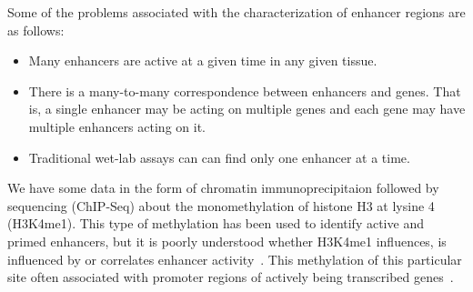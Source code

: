         
        

        Some of the problems associated with the characterization of enhancer regions are as follows:
            \begin{itemize}
        		\item Many enhancers are active at a given time in any given tissue. 
        		\item There is a many-to-many correspondence between enhancers and genes. That is, a single enhancer may be acting on multiple genes and each gene may have multiple enhancers acting on it. 
        		\item Traditional wet-lab assays can can find only one enhancer at a time. 
        	\end{itemize}
        	
        	
        We have some data in the form of chromatin immunoprecipitaion followed by sequencing (ChIP-Seq) about the monomethylation of histone H3 at lysine 4 (H3K4me1). This type of methylation has been used to identify active and primed enhancers, but it is poorly understood whether H3K4me1 influences, is influenced by or correlates enhancer activity~\cite{rada2018h3k4me1}. This methylation of this particular site often associated with promoter regions of actively being transcribed genes~\cite{barski2007high}. 
        